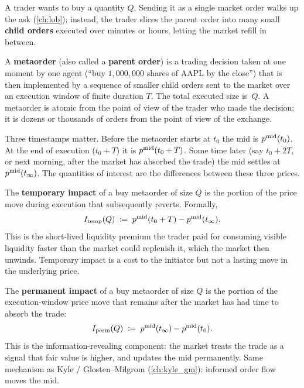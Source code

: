 A trader wants to buy a quantity $Q$. Sending it as a single market
order walks up the ask (\cref{ch:lob}); instead, the trader slices
the parent order into many small \textbf{child orders} executed over
minutes or hours, letting the market refill in between.

\begin{definition}[Metaorder]
A \textbf{metaorder} (also called a \textbf{parent order}) is a
trading decision taken at one moment by one agent (``buy
$1{,}000{,}000$ shares of AAPL by the close'') that is then
implemented by a sequence of smaller child orders sent to the market
over an execution window of finite duration $T$. The total executed
size is~$Q$. A metaorder is atomic from the point of view of the
trader who made the decision; it is dozens or thousands of orders
from the point of view of the exchange.
\end{definition}

Three timestamps matter. Before the metaorder starts at $t_0$ the mid
is $p^{\mathrm{mid}}(t_0)$. At the end of execution ($t_0 + T$) it is
$p^{\mathrm{mid}}(t_0 + T)$. Some time later (say $t_0 + 2T$, or next morning,
after the market has absorbed the trade) the mid settles at
$p^{\mathrm{mid}}(t_\infty)$. The quantities of interest are the differences
between these three prices.

\begin{definition}
\label{def:temp_impact}
The \textbf{temporary impact} of a buy metaorder of size $Q$ is the
portion of the price move during execution that subsequently reverts.
Formally,
\[
  I_{\text{temp}}(Q) \;\coloneqq\; p^{\mathrm{mid}}(t_0 + T) - p^{\mathrm{mid}}(t_\infty).
\]
This is the short-lived liquidity premium the trader paid for
consuming visible liquidity faster than the market could replenish
it, which the market then unwinds. Temporary impact is a cost to the
initiator but not a lasting move in the underlying price.
\end{definition}

\begin{definition}
\label{def:perm_impact}
The \textbf{permanent impact} of a buy metaorder of size $Q$ is the
portion of the execution-window price move that remains after the
market has had time to absorb the trade:
\[
  I_{\text{perm}}(Q) \;\coloneqq\; p^{\mathrm{mid}}(t_\infty) - p^{\mathrm{mid}}(t_0).
\]
This is the information-revealing component: the market treats the
trade as a signal that fair value is higher, and updates the mid
permanently. Same mechanism as Kyle / Glosten--Milgrom
(\cref{ch:kyle_gm}): informed order flow moves the mid.
\end{definition}

